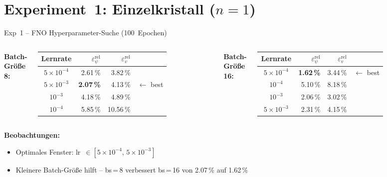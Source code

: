 \documentclass[aspectratio=169]{beamer}
\begin{document}
\section{Experiment~1: Einzelkristall ($n=1$)}
\begin{frame}{Exp~1 -- FNO Hyperparameter-Suche (100~Epochen)}
  \begin{columns}[T]
      \textbf{Batch-Größe 8:}
      \vspace{4pt}
      \renewcommand{\arraystretch}{1.35}
      \begin{tabular}{crrl}
        \toprule
        Lernrate & $\varepsilon_\psi^{\text{rel}}$ & $\varepsilon_v^{\text{rel}}$ & \\
        \midrule
        $5\!\times\!10^{-4}$ & 2.61\,\% & 3.82\,\% \\
        $5\!\times\!10^{-3}$ & \textcolor{bestgreen}{\textbf{2.07\,\%}} & 4.13\,\% & $\leftarrow$ best\\
        $10^{-3}$            & 4.18\,\% & 4.89\,\% & \\
        $10^{-4}$            & 5.85\,\% & 10.56\,\% & \\
        \bottomrule
      \end{tabular}

      \textbf{Batch-Größe 16:}
      \vspace{4pt}
      \renewcommand{\arraystretch}{1.35}
      \begin{tabular}{crrl}
        \toprule
        Lernrate & $\varepsilon_\psi^{\text{rel}}$ & $\varepsilon_v^{\text{rel}}$ & \\
        \midrule
        $5\!\times\!10^{-4}$ & \textcolor{bestgreen}{\textbf{1.62\,\%}} & 3.44\,\% & $\leftarrow$ best \\
        $10^{-4}$            & 5.10\,\% & 8.18\,\% & \\
        $10^{-3}$            & 2.06\,\% & 3.02\,\% & \\
        $5\!\times\!10^{-3}$ & 2.31\,\% & 4.15\,\% & \\      
        \bottomrule
      \end{tabular}
  \end{columns}

  \vspace{10pt}
  \textbf{Beobachtungen:}
  \begin{itemize}
    \item Optimales Fenster: lr~$\in [5\!\times\!10^{-4},\,5\!\times\!10^{-3}]$
    \item Kleinere Batch-Größe hilft -- bs\,=\,8 verbessert bs\,=\,16 von 2.07\,\% auf 1.62\,\%
  \end{itemize}
\end{frame}
\end{document}
